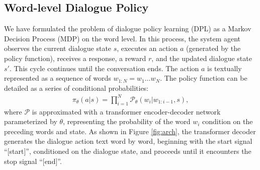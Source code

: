 \documentclass[letterpaper]{article} %
\begin{document}
\subsection{Word-level Dialogue Policy}
We have formulated the problem of dialogue policy learning (DPL) as a Markov Decision Process (MDP) on the word level. In this process, the system agent observes the current dialogue state $s$, executes an action $a$ (generated by the policy function), receives a response, a reward $r$, and the updated dialogue state $s'$. This cycle continues until the conversation ends. The action $a$ is textually represented as a sequence of words $w_{1:N} = w_{1}\ldots w_{N}$. The policy function can be detailed as a series of conditional probabilities:
\begin{equation}
\begin{aligned}
    \pi_{\theta}(a|s) = \prod_{i = 1}^{N} \mathcal{P}_{\theta}(w_i|w_{1:i-1}, s), 
    \label{e:2}
\end{aligned}
\end{equation}
where $\mathcal{P}$ is approximated with a transformer encoder-decoder network parameterized by $\theta$, representing the probability of the word $w_i$ condition on the preceding words and state. As shown in Figure \ref{fig:arch}, the transformer decoder generates the dialogue action text word by word, beginning with the start signal “[start]”, conditioned on the dialogue state, and proceeds until it encounters the stop signal “[end]”. 
\end{document}
